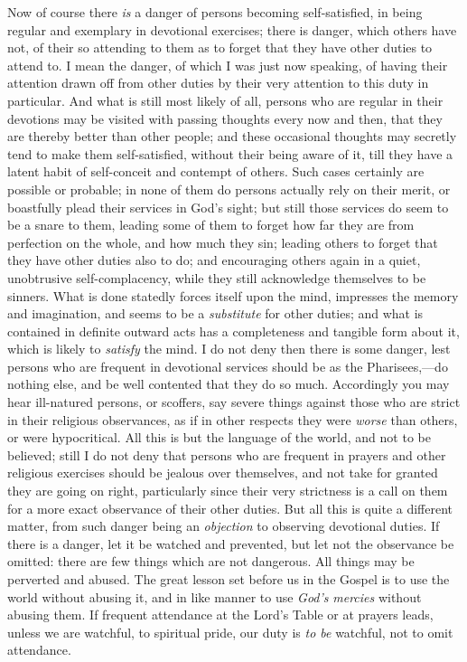 Now of course there \emph{is} a danger of persons becoming
self-satisfied, in being regular and exemplary in devotional
exercises; there is danger, which others have not, of their so
attending to them as to forget that they have other duties to attend
to. I mean the danger, of which I was just now speaking, of having
their attention drawn off from other duties by their very attention to
this duty in particular. And what is still most likely of all, persons
who are regular in their devotions may be visited with passing
thoughts every now and then, that they are thereby better than other
people; and these occasional thoughts may secretly tend to make them
self-satisfied, without their being aware of it, till they have a
latent habit of self-conceit and contempt of others. Such cases
certainly are possible or probable; in none of them do persons
actually rely on their merit, or boastfully plead their services in
God's sight; but still those services do seem to be a snare to them,
leading some of them to forget how far they are from perfection on the
whole, and how much they sin; leading others to forget that they have
other duties also to do; and encouraging others again in a quiet,
unobtrusive self-complacency, while they still acknowledge themselves
to be sinners. What is done statedly forces itself upon the mind,
impresses the memory and imagination, and seems to be a \emph{substitute}
for other duties; and what is contained in definite outward acts has a
completeness and tangible form about it, which is likely to \emph{satisfy}
the mind. I do not deny then there is some danger, lest persons who
are frequent in devotional services should be as the Pharisees,—do
nothing else, and be well contented that they do so much. Accordingly
you may hear ill-natured persons, or scoffers, say severe things
against those who are strict in their religious observances, as if in
other respects they were \emph{worse} than others, or were
hypocritical. All this is but the language of the world, and not to be
believed; still I do not deny that persons who are frequent in prayers
and other religious exercises should be jealous over themselves, and
not take for granted they are going on right, particularly since their
very strictness is a call on them for a more exact observance of their
other duties. But all this is quite a different matter, from such
danger being an \emph{objection} to observing devotional duties. If
there is a danger, let it be watched and prevented, but let not the
observance be omitted: there are few things which are not dangerous.
All things may be perverted and abused. The great lesson set before us
in the Gospel is to use the world without abusing it, and in like
manner to use \emph{God's} \emph{mercies} without abusing them. If
frequent attendance at the Lord's Table or at prayers leads, unless we
are watchful, to spiritual pride, our duty is \emph{to be} watchful,
not to omit attendance.

